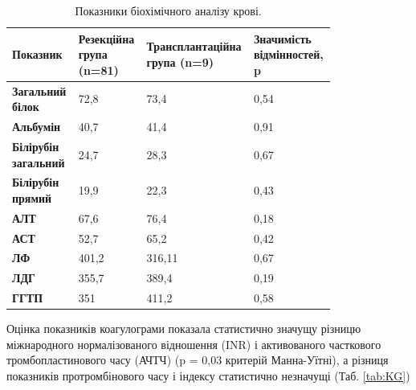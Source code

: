 \begin{table}[]
\centering
\caption{Показники біохімічного аналізу крові.}
\label{tab:BAK}
\begin{tabular}{|p{0.2\linewidth}|
                 p{0.2\linewidth}|
                 p{0.2\linewidth}|
                 p{0.2\linewidth}|}
\hline
{\color[HTML]{231F20} \textbf{Показник}} &
  {\color[HTML]{231F20} \textbf{Резекційна група (n=81)}} &
  {\color[HTML]{231F20} \textbf{Транс\-план\-тацій\-на група (n=9)}} &
  {\color[HTML]{231F20} \textbf{Значимість відмінностей, p}} \\ \hline
{\color[HTML]{231F20} \textbf{Загальний білок}}     & {\color[HTML]{231F20} 72,8} & {\color[HTML]{231F20} 73,4} & 0,54 \\ \hline
{\color[HTML]{231F20} \textbf{Альбумін}}            & {\color[HTML]{231F20} 40,7} & {\color[HTML]{231F20} 41,4} & 0,91 \\ \hline
{\color[HTML]{231F20} \textbf{Білірубін загальний}} & {\color[HTML]{231F20} 24,7} & {\color[HTML]{231F20} 28,3} & 0,67 \\ \hline
{\color[HTML]{231F20} \textbf{Білірубін прямий}}    & {\color[HTML]{231F20} 19,9} & {\color[HTML]{231F20} 22,3} & 0,43 \\ \hline
\textbf{АЛТ}                                        & 67,6                        & 76,4                        & 0,18 \\ \hline
\textbf{АСТ}                                        & 52,7                        & 65,2                        & 0,42 \\ \hline
\textbf{ЛФ}                                         & 401,2                       & 316,11                      & 0,67 \\ \hline
\textbf{ЛДГ}                                        & 355,7                       & 389,4                       & 0,19 \\ \hline
\textbf{ГГТП}                                       & 351                         & 411,2                       & 0,58 \\ \hline
\end{tabular}
\end{table}


Оцінка показників коагулограми показала статистично значущу різницю міжнародного нормалізованого відношення (INR) і активованого часткового тромбопластинового часу (АЧТЧ) (p = 0,03 критерій Манна-Уїтні), а різниця показників протромбінового часу і індексу статистично незначущі (Таб. \ref{tab:KG})

